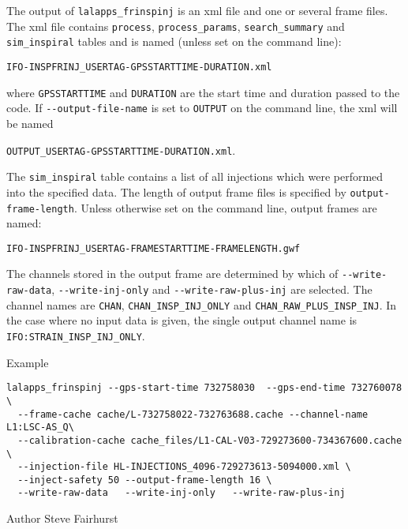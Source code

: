 \begin{entry}
The output of \verb$lalapps_frinspinj$ is an xml file and one or several
frame files.  The xml file contains
\verb$process$, \verb$process_params$, \verb$search_summary$ and
\verb$sim_inspiral$ tables and is named (unless set on the command line):
\begin{center}
\texttt{IFO-INSPFRINJ\_USERTAG-GPSSTARTTIME-DURATION.xml}\\
\end{center}
where \texttt{GPSSTARTTIME} and \texttt{DURATION} are the start time and
duration passed to the code.  If \verb$--output-file-name$ is set to
\verb$OUTPUT$ on the command line, the xml will be named
\begin{center}
\texttt{OUTPUT\_USERTAG-GPSSTARTTIME-DURATION.xml}.\\
\end{center}
The \verb$sim_inspiral$ table contains a list of all injections which
were performed into the specified data.  The length of output frame
files is specified by \verb$output-frame-length$.  Unless otherwise set
on the command line, output frames are named: 
\begin{center}
\texttt{IFO-INSPFRINJ\_USERTAG-FRAMESTARTTIME-FRAMELENGTH.gwf}\\
\end{center}
The channels stored in the output frame are determined by which of
\verb$--write-raw-data$, \verb$--write-inj-only$ and
\verb$--write-raw-plus-inj$ are selected.  The channel names are
\verb$CHAN$, \verb$CHAN_INSP_INJ_ONLY$ and
\verb$CHAN_RAW_PLUS_INSP_INJ$.  In the case where no input data is
given, the single output channel name is \verb$IFO:STRAIN_INSP_INJ_ONLY$.

\item[Example]
\begin{verbatim}
lalapps_frinspinj --gps-start-time 732758030  --gps-end-time 732760078 \
  --frame-cache cache/L-732758022-732763688.cache --channel-name L1:LSC-AS_Q\	
  --calibration-cache cache_files/L1-CAL-V03-729273600-734367600.cache \
  --injection-file HL-INJECTIONS_4096-729273613-5094000.xml \
  --inject-safety 50 --output-frame-length 16 \
  --write-raw-data   --write-inj-only   --write-raw-plus-inj 
\end{verbatim}

\item[Author] 
Steve Fairhurst
\end{entry}




%
% 
\clearpage
